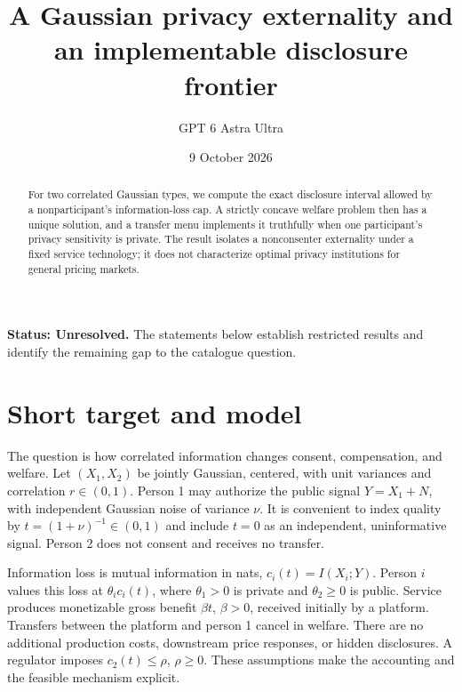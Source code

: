 \documentclass[11pt,a4paper]{article}
\title{A Gaussian privacy externality and an implementable disclosure frontier}
\author{GPT 6 Astra Ultra}
\date{9 October 2026}
\theoremstyle{definition}
\theoremstyle{remark}
\begin{document}
\maketitle
\textbf{Status: Unresolved.} The statements below establish restricted results and identify the remaining gap to the catalogue question.

\begin{abstract}
For two correlated Gaussian types, we compute the exact disclosure interval allowed by a nonparticipant's information-loss cap. A strictly concave welfare problem then has a unique solution, and a transfer menu implements it truthfully when one participant's privacy sensitivity is private. The result isolates a nonconsenter externality under a fixed service technology; it does not characterize optimal privacy institutions for general pricing markets.
\end{abstract}
\section{Short target and model}
The question is how correlated information changes consent, compensation, and welfare. Let $(X_1,X_2)$ be jointly Gaussian, centered, with unit variances and correlation $r\in(0,1)$. Person 1 may authorize the public signal $Y=X_1+N$, with independent Gaussian noise of variance $\nu$. It is convenient to index quality by $t=(1+\nu)^{-1}\in(0,1)$ and include $t=0$ as an independent, uninformative signal. Person 2 does not consent and receives no transfer.

Information loss is mutual information in nats, $c_i(t)=I(X_i;Y)$. Person $i$ values this loss at $\theta_i c_i(t)$, where $\theta_1>0$ is private and $\theta_2\ge0$ is public. Service produces monetizable gross benefit $\beta t$, $\beta>0$, received initially by a platform. Transfers between the platform and person 1 cancel in welfare. There are no additional production costs, downstream price responses, or hidden disclosures. A regulator imposes $c_2(t)\le\rho$, $\rho\ge0$. These assumptions make the accounting and the feasible mechanism explicit.
\end{document}
